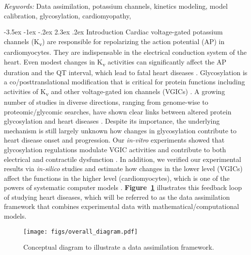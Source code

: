 \documentclass[11pt]{article}
\makeatletter
\renewcommand\section{\@startsection {section}{1}{\z@}%
                                   {-3.5ex \@plus -1ex \@minus -.2ex}%
                                   {2.3ex \@plus.2ex}%
                                   {\normalfont\fontfamily{phv}\fontsize{16}{19}\bfseries}}
\makeatother
\begin{document}
\noindent%
{\it Keywords:} Data assimilation, potassium channels, kinetics modeling, model calibration, glycosylation, cardiomyopathy,

{} %

\section{Introduction} \label{s:intro}
Cardiac voltage-gated potassium channels (K\textsubscript{v}) are responsible for repolarizing the action potential (AP) in cardiomyocytes. They are indispensable in the electrical conduction system of the heart. Even modest changes in K\textsubscript{v} activities can significantly affect the AP duration and the QT interval, which lead to fatal heart diseases \citep{ravens2008role}. Glycosylation is a co/posttranslational modification that is critical for protein functions including activities of K\textsubscript{v} and other voltage-gated ion channels (VGICs) \citep{ohtsubo2006glycosylation,ednie2012modulation}. A growing number of studies in diverse directions, ranging from genome-wise to proteomic/glycomic searches, have shown clear links between altered protein glycosylation and heart diseases \citep{yung2004gene,yang2015glycoproteins,miura2016glycomics}. Despite its importance, the underlying mechanism is still largely unknown how changes in glycosylation contribute to heart disease onset and progression. Our \textit{in-vitro} experiments showed that glycosylation regulations modulate VGIC activities and contribute to both electrical and contractile dysfunction \citep{ednie2013sialicNav1,ednie2015sialicKv,ednie2019reduced}. In addition, we verified our experimental results via \textit{in-silico} studies and estimate how changes in the lower level (VGICs) affect the functions in the higher level (cardiomyocytes), which is one of the powers of systematic computer models \citep{du2013silico,du2015statistical,du2017silico,kim2022simulation}. \textbf{Figure~\ref{fig:framework_diagram}} illustrates this feedback loop of studying heart diseases, which will be referred to as the data assimilation framework that combines experimental data with mathematical/computational models.
\begin{figure}[!ht]
    \centering
    \texttt{[image: figs/overall\_diagram.pdf]}
    \caption{Conceptual diagram to illustrate a data assimilation framework.}
    \label{fig:framework_diagram}
\end{figure}
\end{document}
